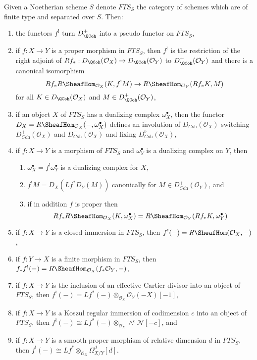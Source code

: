 \medskip\noindent
Given a Noetherian scheme $S$ denote $\textit{FTS}_S$ the category
of schemes which are of finite type and separated over $S$. Then:
\begin{enumerate}
\item the functors $f^!$ turn $D_\QCoh^+$ into a pseudo functor
on $\textit{FTS}_S$,
\item if $f : X \to Y$ is a proper morphism in $\textit{FTS}_S$,
then $f^!$ is the restriction of the right adjoint of
$Rf_* : D_\QCoh(\mathcal{O}_X) \to D_\QCoh(\mathcal{O}_Y)$
to $D_\QCoh^+(\mathcal{O}_Y)$ and there is a canonical isomorphism
$$
Rf_*R\SheafHom_{\mathcal{O}_X}(K, f^!M)
\to
R\SheafHom_{\mathcal{O}_Y}(Rf_*K, M)
$$
for all $K \in D_\QCoh(\mathcal{O}_X)$ and $M \in D_\QCoh^+(\mathcal{O}_Y)$,
\item if an object $X$ of $\textit{FTS}_S$ has a dualizing complex
$\omega_X^\bullet$, then the functor
$D_X = R\SheafHom_{\mathcal{O}_X}(-, \omega_X^\bullet)$
defines an involution of $D_{\textit{Coh}}(\mathcal{O}_X)$
switching $D_{\textit{Coh}}^+(\mathcal{O}_X)$ and
$D_{\textit{Coh}}^-(\mathcal{O}_X)$ and fixing
$D_{\textit{Coh}}^b(\mathcal{O}_X)$,
\item if $f : X \to Y$ is a morphism of $\textit{FTS}_S$
and $\omega_Y^\bullet$ is a dualizing complex on $Y$, then
\begin{enumerate}
\item $\omega_X^\bullet = f^!\omega_Y^\bullet$ is a dualizing complex for $X$,
\item $f^!M = D_X(Lf^*D_Y(M))$ canonically for
$M \in D_{\textit{Coh}}^+(\mathcal{O}_Y)$, and
\item if in addition $f$ is proper then
$$
Rf_*R\SheafHom_{\mathcal{O}_X}(K, \omega_X^\bullet) =
R\SheafHom_{\mathcal{O}_Y}(Rf_*K, \omega_Y^\bullet)
$$
\end{enumerate}
\item if $f : X \to Y$ is a closed immersion in $\textit{FTS}_S$,
then $f^!(-) = R\SheafHom(\mathcal{O}_X, -)$,
\item if $f : Y \to X$ is a finite morphism in $\textit{FTS}_S$,
then $f_*f^!(-) = R\SheafHom_{\mathcal{O}_X}(f_*\mathcal{O}_Y, -)$,
\item if $f : X \to Y$ is the inclusion of an effective Cartier divisor
into an object of $\textit{FTS}_S$, then
$f^!(-) = Lf^*(-) \otimes_{\mathcal{O}_X} \mathcal{O}_Y(-X)[-1]$,
\item if $f : X \to Y$ is a Koszul regular immersion of codimension $c$
into an object of $\textit{FTS}_S$, then
$f^!(-) \cong Lf^*(-) \otimes_{\mathcal{O}_X} \wedge^c\mathcal{N}[-c]$, and
\item if $f : X \to Y$ is a smooth proper morphism of relative dimension $d$
in $\textit{FTS}_S$, then
$f^!(-) \cong Lf^*  \otimes_{\mathcal{O}_X} \Omega^d_{X/Y}[d]$.
\end{enumerate}
